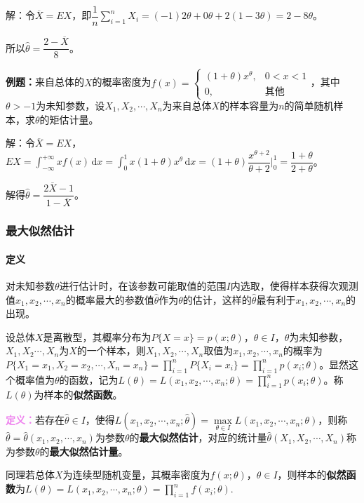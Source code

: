 \documentclass[UTF8, 12pt]{ctexart}
\begin{document}
解：令$\overline{X}=EX$，即$\dfrac{1}{n}\sum\limits_{i=1}^nX_i=(-1)2\theta+0\theta+2(1-3\theta)=2-8\theta$。

所以$\hat{\theta}=\dfrac{2-\overline{X}}{8}$。

\textbf{例题：}来自总体的$X$的概率密度为$f(x)=\left\{\begin{array}{ll}
    (1+\theta)x^\theta, & 0<x<1 \\
    0, & \text{其他}
\end{array}\right.$，其中$\theta>-1$为未知参数，设$X_1,X_2,\cdots,X_n$为来自总体$X$的样本容量为$n$的简单随机样本，求$\theta$的矩估计量。

解：令$\overline{X}=EX$，$EX=\int_{-\infty}^{+\infty}xf(x)\,\textrm{d}x=\int_0^1x(1+\theta)x^\theta\,\textrm{d}x=(1+\theta)\dfrac{x^{\theta+2}}{\theta+2}\bigg|_0^1=\dfrac{1+\theta}{2+\theta}$。

解得$\hat{\theta}=\dfrac{2\overline{X}-1}{1-\overline{X}}$。

\subsubsection{最大似然估计}

\paragraph{定义} \leavevmode \medskip

对未知参数$\theta$进行估计时，在该参数可能取值的范围$I$内选取，使得样本获得次观测值$x_1,x_2,\cdots,x_n$的概率最大的参数值$\hat{\theta}$作为$\theta$的估计，这样的$\hat{\theta}$最有利于$x_1,x_2,\cdots,x_n$的出现。

设总体$X$是离散型，其概率分布为$P\{X=x\}=p(x;\theta)$，$\theta\in I$，$\theta$为未知参数，$X_1,X_2\cdots,X_n$为$X$的一个样本，则$X_1,X_2,\cdots,X_n$取值为$x_1,x_2,\cdots,x_n$的概率为$P\{X_1=x_1,X_2=x_2,\cdots,X_n=x_n\}=\prod\limits_{i=1}^nP\{X_i=x_i\}=\prod\limits_{i=1}^np(x_i;\theta)$。显然这个概率值为$\theta$的函数，记为$L(\theta)=L(x_1,x_2,\cdots,x_n;\theta)=\prod\limits_{i=1}^np(x_i;\theta)$。称$L(\theta)$为样本的\textbf{似然函数}。

\textcolor{violet}{\textbf{定义：}}若存在$\hat{\theta}\in I$，使得$L(x_1,x_2,\cdots,x_n;\hat{\theta})=\max\limits_{\theta\in I}L(x_1,x_2,\cdots,x_n;\theta)$，则称$\hat{\theta}=\hat{\theta}(x_1,x_2,\cdots,x_n)$为参数$\theta$的\textbf{最大似然估计}，对应的统计量$\hat{\theta}(X_1,X_2,\cdots,X_n)$称为参数$\theta$的\textbf{最大似然估计量}。

同理若总体$X$为连续型随机变量，其概率密度为$f(x;\theta)$，$\theta\in I$，则样本的\textbf{似然函数}为$L(\theta)=L(x_1,x_2,\cdots,x_n;\theta)=\prod\limits_{i=1}^nf(x_i;\theta)$.
\end{document}
